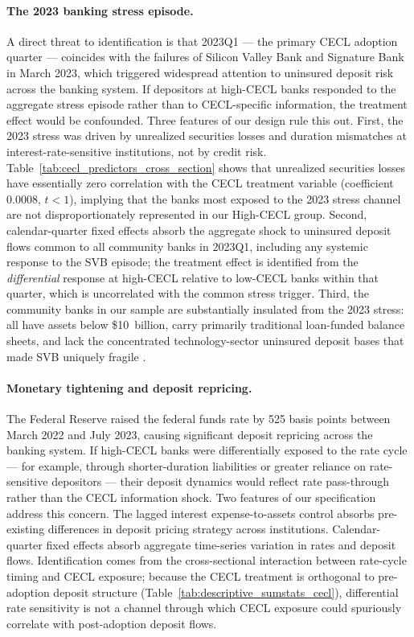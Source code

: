 \paragraph{The 2023 banking stress episode.}
A direct threat to identification is that 2023Q1 --- the primary CECL adoption
quarter --- coincides with the failures of Silicon Valley Bank and Signature Bank
in March 2023, which triggered widespread attention to uninsured deposit risk
across the banking system.  If depositors at high-CECL banks responded to
the aggregate stress episode rather than to CECL-specific information, the
treatment effect would be confounded.  Three features of our design rule this
out.  First, the 2023 stress was driven by unrealized securities losses and
duration mismatches at interest-rate-sensitive institutions, not by credit
risk.  Table~\ref{tab:cecl_predictors_cross_section} shows that unrealized
securities losses have essentially zero correlation with the CECL treatment
variable (coefficient 0.0008, $t < 1$), implying that the banks most exposed
to the 2023 stress channel are not disproportionately represented in our
High-CECL group.  Second, calendar-quarter fixed effects absorb the aggregate
shock to uninsured deposit flows common to all community banks in 2023Q1,
including any systemic response to the SVB episode; the treatment effect is
identified from the \textit{differential} response at high-CECL relative to
low-CECL banks within that quarter, which is uncorrelated with the common
stress trigger.  Third, the community banks in our sample are substantially
insulated from the 2023 stress: all have assets below \$10~billion, carry
primarily traditional loan-funded balance sheets, and lack the concentrated
technology-sector uninsured deposit bases that made SVB uniquely fragile
\citep{jiang2024monetary}.

\paragraph{Monetary tightening and deposit repricing.}
The Federal Reserve raised the federal funds rate by 525 basis points between
March 2022 and July 2023, causing significant deposit repricing across the
banking system.  If high-CECL banks were differentially exposed to the rate
cycle --- for example, through shorter-duration liabilities or greater reliance
on rate-sensitive depositors --- their deposit dynamics would reflect rate
pass-through rather than the CECL information shock.  Two features of our
specification address this concern.  The lagged interest expense-to-assets
control absorbs pre-existing differences in deposit pricing strategy across
institutions.  Calendar-quarter fixed effects absorb aggregate time-series
variation in rates and deposit flows.  Identification comes from the
cross-sectional interaction between rate-cycle timing and CECL exposure;
because the CECL treatment is orthogonal to pre-adoption deposit structure
(Table~\ref{tab:descriptive_sumstats_cecl}), differential rate sensitivity
is not a channel through which CECL exposure could spuriously correlate
with post-adoption deposit flows.

